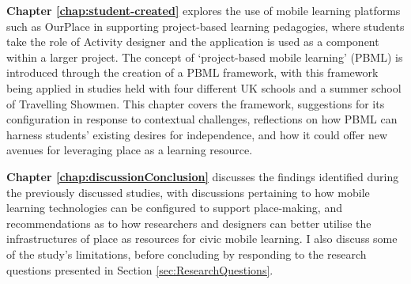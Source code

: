 \textbf{Chapter \ref{chap:student-created}} explores the use of mobile learning platforms such as OurPlace in supporting project-based learning pedagogies, where students take the role of Activity designer and the application is used as a component within a larger project. The concept of `project-based mobile learning' (PBML) is introduced through the creation of a PBML framework, with this framework being applied in studies held with four different UK schools and a summer school of Travelling Showmen. This chapter covers the framework, suggestions for its configuration in response to contextual challenges, reflections on how PBML can harness students’ existing desires for independence, and how it could offer new avenues for leveraging place as a learning resource. 

\textbf{Chapter \ref{chap:discussionConclusion}} discusses the findings identified during the previously discussed studies, with discussions pertaining to how mobile learning technologies can be configured to support place-making, and recommendations as to how researchers and designers can better utilise the infrastructures of place as resources for civic mobile learning. I also discuss some of the study’s limitations, before concluding by responding to the research questions presented in Section \ref{sec:ResearchQuestions}.